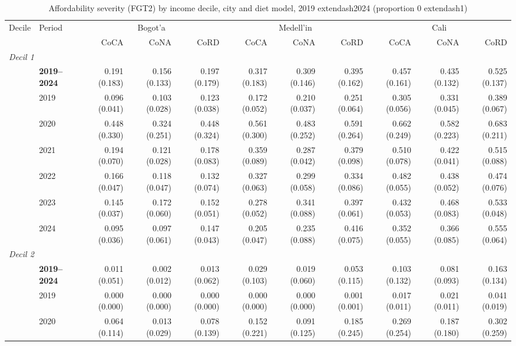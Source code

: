 \begin{table}[htbp]
\centering\small\setlength{\tabcolsep}{3pt}
\caption{Affordability severity (FGT2) by income decile, city and diet model, 2019	extendash{}2024 (proportion 0	extendash{}1)}
\label{tab:afford_severity}
\begin{tabular}{llrrrrrrrrr}
\toprule
Decile & Period & \multicolumn{3}{c}{Bogot'{a}} & \multicolumn{3}{c}{Medell'{i}n} & \multicolumn{3}{c}{Cali} \\
 & & CoCA & CoNA & CoRD & CoCA & CoNA & CoRD & CoCA & CoNA & CoRD \\
\midrule
\multicolumn{11}{l}{\textit{Decil 1}} \\
 & \textbf{2019–2024} & 0.191 (0.183) & 0.156 (0.133) & 0.197 (0.179) & 0.317 (0.183) & 0.309 (0.146) & 0.395 (0.162) & 0.457 (0.161) & 0.435 (0.132) & 0.525 (0.137) \\
 & 2019 & 0.096 (0.041) & 0.103 (0.028) & 0.123 (0.038) & 0.172 (0.052) & 0.210 (0.037) & 0.251 (0.064) & 0.305 (0.056) & 0.331 (0.045) & 0.389 (0.067) \\
 & 2020 & 0.448 (0.330) & 0.324 (0.251) & 0.448 (0.324) & 0.561 (0.300) & 0.483 (0.252) & 0.591 (0.264) & 0.662 (0.249) & 0.582 (0.223) & 0.683 (0.211) \\
 & 2021 & 0.194 (0.070) & 0.121 (0.028) & 0.178 (0.083) & 0.359 (0.089) & 0.287 (0.042) & 0.379 (0.098) & 0.510 (0.078) & 0.422 (0.041) & 0.515 (0.088) \\
 & 2022 & 0.166 (0.047) & 0.118 (0.047) & 0.132 (0.074) & 0.327 (0.063) & 0.299 (0.058) & 0.334 (0.086) & 0.482 (0.055) & 0.438 (0.052) & 0.474 (0.076) \\
 & 2023 & 0.145 (0.037) & 0.172 (0.060) & 0.152 (0.051) & 0.278 (0.052) & 0.341 (0.088) & 0.397 (0.061) & 0.432 (0.053) & 0.468 (0.083) & 0.533 (0.048) \\
 & 2024 & 0.095 (0.036) & 0.097 (0.061) & 0.147 (0.043) & 0.205 (0.047) & 0.235 (0.088) & 0.416 (0.075) & 0.352 (0.055) & 0.366 (0.085) & 0.555 (0.064) \\
\midrule
\multicolumn{11}{l}{\textit{Decil 2}} \\
 & \textbf{2019–2024} & 0.011 (0.051) & 0.002 (0.012) & 0.013 (0.062) & 0.029 (0.103) & 0.019 (0.060) & 0.053 (0.115) & 0.103 (0.132) & 0.081 (0.093) & 0.163 (0.134) \\
 & 2019 & 0.000 (0.000) & 0.000 (0.000) & 0.000 (0.000) & 0.000 (0.000) & 0.000 (0.000) & 0.001 (0.001) & 0.017 (0.011) & 0.021 (0.011) & 0.041 (0.019) \\
 & 2020 & 0.064 (0.114) & 0.013 (0.029) & 0.078 (0.139) & 0.152 (0.221) & 0.091 (0.125) & 0.185 (0.245) & 0.269 (0.254) & 0.187 (0.180) & 0.302 (0.259) \\

\end{tabular}
\end{table}
